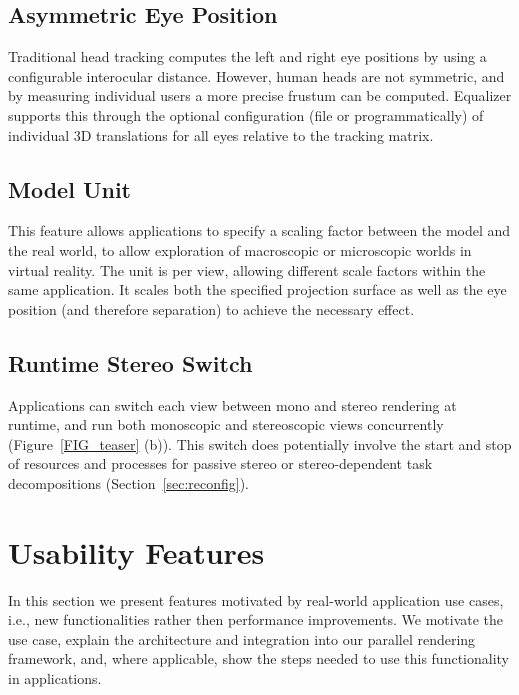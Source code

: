 \documentclass[10pt,journal,compsoc]{IEEEtran}
\newcommand{\sref}[1]{Section~\ref{#1}}
\newcommand{\fig}[1]{Figure~\ref{#1}}
\begin{document}
\subsection{Asymmetric Eye Position}

Traditional head tracking computes the left and right eye positions by using a
configurable interocular distance. However, human heads are not symmetric, and
by measuring individual users a more precise frustum can be computed.
\textsf{Equalizer} supports this through the optional configuration (file or
programmatically) of individual 3D translations for all eyes relative to the
tracking matrix.

\subsection{Model Unit}

This feature allows applications to specify a scaling factor between the model
and the real world, to allow exploration of macroscopic or microscopic worlds in
virtual reality. The unit is per view, allowing different scale factors within
the same application. It scales both the specified projection surface as well
as the eye position (and therefore separation) to achieve the necessary effect.

\subsection{Runtime Stereo Switch}

Applications can switch each view between mono and stereo rendering at runtime,
and run both monoscopic and stereoscopic views concurrently (\fig{FIG_teaser}
(b)). This switch does potentially involve the start and stop of resources and
processes for passive stereo or stereo-dependent task decompositions
(\sref{sec:reconfig}).

\section{Usability Features}

In this section we present features motivated by real-world application use
cases, i.e., new functionalities rather then performance improvements. We
motivate the use case, explain the architecture and integration into our
parallel rendering framework, and, where applicable, show the steps needed to
use this functionality in applications.
\end{document}
